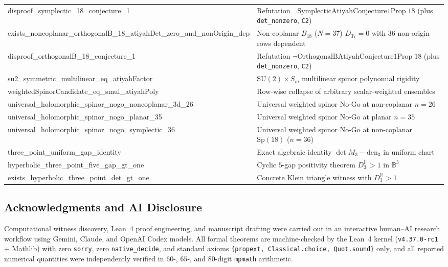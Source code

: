 \documentclass[11pt,reqno]{amsart}
\theoremstyle{remark}
\newcommand{\B}{\mathbb{B}}
\newcommand{\Hy}{\mathbb{H}}
\begin{document}
\begin{table}[htbp]
\begin{tabular}{>{\ttfamily\raggedright\arraybackslash}p{}>{\raggedright\arraybackslash}p{}}
disproof\_symplectic\_18\_conjecture\_1 & Refutation $\neg \mathrm{Symplectic\allowbreak Atiyah\allowbreak Conjecture1Prop}\; 18$ (plus \texttt{det\_nonzero}, \texttt{C2}) \\
exists\_noncoplanar\_orthogonalB\_18\_atiyahDet\_zero\_and\_nonOrigin\_dep & Non-coplanar $B_{18}$ ($N = 37$) $D_{37} = 0$ with $36$ non-origin rows dependent \\
disproof\_orthogonalB\_18\_conjecture\_1 & Refutation $\neg \mathrm{OrthogonalB\allowbreak Atiyah\allowbreak Conjecture1Prop}\; 18$ (plus \texttt{det\_nonzero}, \texttt{C2}) \\
su2\_symmetric\_multilinear\_eq\_atiyahFactor & $\mathrm{SU}(2) \times S_m$ multilinear spinor polynomial rigidity \\
weightedSpinorCandidate\_eq\_smul\_atiyahPoly & Row-wise collapse of arbitrary scalar-weighted ensembles \\
universal\_holomorphic\_spinor\_nogo\_noncoplanar\_3d\_26 & Universal weighted spinor No-Go at non-coplanar $n = 26$ \\
universal\_holomorphic\_spinor\_nogo\_planar\_35 & Universal weighted spinor No-Go at planar $n = 35$ \\
universal\_holomorphic\_spinor\_nogo\_symplectic\_36 & Universal weighted spinor No-Go at non-coplanar $\mathrm{Sp}(18)$ ($n = 36$) \\
three\_point\_uniform\_gap\_identity & Exact algebraic identity $\det M_3 - \mathrm{den}_3$ in uniform chart \\
hyperbolic\_three\_point\_five\_gap\_gt\_one & Cyclic $5$-gap positivity theorem $D_3^{\Hy} > 1$ in $\B^3$ \\
exists\_hyperbolic\_three\_point\_det\_gt\_one & Concrete Klein triangle witness with $D_3^{\Hy} > 1$ \\
\bottomrule
\end{tabular}
\end{table}

\clearpage
\subsection*{Acknowledgments and AI Disclosure}
Computational witness discovery, Lean~4 proof engineering, and manuscript drafting were carried out in an interactive human--AI research workflow using Gemini, Claude, and OpenAI Codex models.
All formal theorems are machine-checked by the Lean~4 kernel (\texttt{v4.37.0-rc1} + Mathlib) with zero \texttt{sorry}, zero \texttt{native\_decide}, and standard axioms \texttt{\{propext, Classical.choice, Quot.sound\}} only, and all reported numerical quantities were independently verified in $60$-, $65$-, and $80$-digit \texttt{mpmath} arithmetic.
\end{document}
